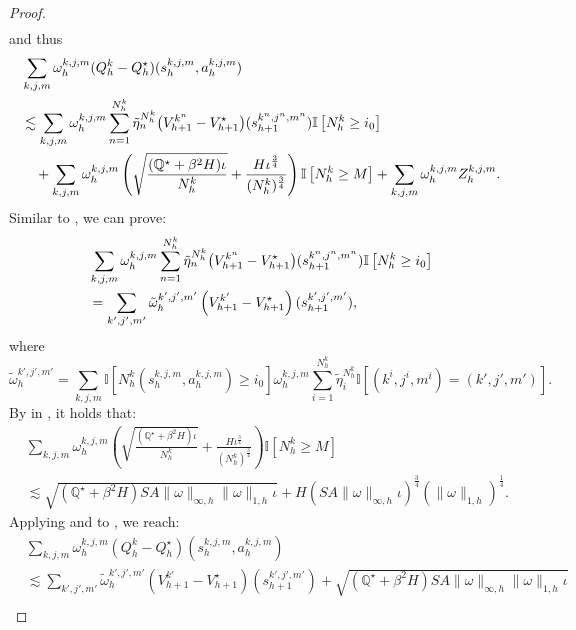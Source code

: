 \documentclass{article}
\begin{document}
\begin{proof}
\begin{align*}
    \end{align*}
and thus
    \begin{align}    
        &\sum_{k,j,m} \omega_{h}^{k,j,m} (Q_h^{k} - Q_h^{\star})(s_h^{k,j,m}, a_h^{k,j,m}) \nonumber\\
       &\lesssim \sum_{k,j,m} \omega_{h}^{k,j,m}\sum_{n=1}^{N_h^k} \Tilde{\eta}_n^{N_h^k}  \big(V_{h+1}^{k^n}-V_{h+1}^{\star}\big)(s_{h+1}^{k^n,j^n,m^n})\mathbb{I}\left[N_h^k \geq i_0 \right] \nonumber\\
       &\quad+\sum_{k,j,m} \omega_{h}^{k,j,m}\left(\sqrt{\frac{(\mathbb{Q^{\star}}+\beta^2H)\iota}{N_h^k}} +\frac{H\iota^{\frac{3}{4}}}{(N_h^k)^{\frac{3}{4}}}\right)\mathbb{I}\left[N_h^k \geq M \right] +\sum_{k,j,m} \omega_{h}^{k,j,m} Z_{h}^{k,j,m}. \label{Rstarrecur}
    \end{align}
    Similar to , we can prove:
    \begin{align}
    \label{recurvstar}
    &\sum_{k,j,m} \omega_{h}^{k,j,m}\sum_{n=1}^{N_h^k} \Tilde{\eta}_n^{N_h^k}  \big(V_{h+1}^{k^n}-V_{h+1}^{\star}\big)(s_{h+1}^{k^n,j^n,m^n})\mathbb{I}\left[N_h^k \geq i_0 \right] \nonumber\\
    &= \sum_{k',j',m'}\tilde{\omega}_{h}^{k',j',m'} \left(V_{h+1}^{k'} - V_{h+1}^{\star}\right)(s_{h+1}^{k',j',m'}),
    \end{align}
    where
$$\tilde{\omega}_{h}^{k',j',m'} = \sum_{k,j,m}\mathbb{I}\left[N_h^k(s_{h}^{k,j,m},a_{h}^{k,j,m}) \geq i_0 \right]\omega_{h}^{k,j,m}\sum_{i = 1}^{N_h^k}\tilde{\eta}_i^{N_h^k}\mathbb{I}\left[(k^i,j^i,m^i) = (k',j',m') \right].$$
    By  in , it holds that:
    \begin{align}
    \label{sum12}
        &\sum_{k,j,m} \omega_{h}^{k,j,m}\left(\sqrt{\frac{(\mathbb{Q^{\star}}+\beta^2H)\iota}{N_h^k}}+\frac{H\iota^{\frac{3}{4}}}{(N_h^k)^{\frac{3}{4}}}\right)\mathbb{I}\left[N_h^k \geq M \right] \nonumber\\
        &\lesssim \sqrt{(\mathbb{Q^{\star}}+\beta^2H)SA\|\omega\|_{\infty,h}\|\omega\|_{1,h}\iota} + H(SA\|\omega\|_{\infty,h}\iota)^{\frac{3}{4}}(\|\omega\|_{1,h})^{\frac{1}{4}}.
    \end{align}
    Applying  and  to , we reach:
    \begin{align*}
     &\sum_{k,j,m} \omega_{h}^{k,j,m} (Q_h^{k} - Q_h^{\star})(s_h^{k,j,m}, a_h^{k,j,m}) \\        
        &\lesssim \sum_{k',j',m'}\tilde{\omega}_{h}^{k',j',m'} \left(V_{h+1}^{k'} - V_{h+1}^{\star}\right)(s_{h+1}^{k',j',m'}) + \sqrt{(\mathbb{Q^{\star}}+\beta^2H)SA\|\omega\|_{\infty,h}\|\omega\|_{1,h}\iota} \\

\end{align*}
\end{proof}
\end{document}

